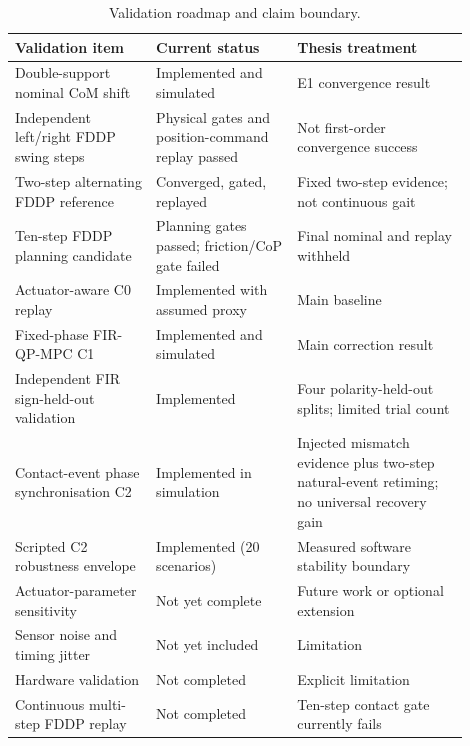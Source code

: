 \documentclass[12pt,a4paper]{report}
\begin{document}
\begin{table}[htbp]
\centering
\caption{Validation roadmap and claim boundary.}
\label{tab:validation_roadmap}
\begin{tabular}{@{}p{0.28\linewidth}p{0.28\linewidth}p{0.34\linewidth}@{}}
\toprule
Validation item & Current status & Thesis treatment \\
\midrule
Double-support nominal CoM shift & Implemented and simulated & E1 convergence result \\
Independent left/right FDDP swing steps & Physical gates and position-command replay passed & Not first-order convergence success \\
Two-step alternating FDDP reference & Converged, gated, replayed & Fixed two-step evidence; not continuous gait \\
Ten-step FDDP planning candidate & Planning gates passed; friction/CoP gate failed & Final nominal and replay withheld \\
Actuator-aware C0 replay & Implemented with assumed proxy & Main baseline \\
Fixed-phase FIR-QP-MPC C1 & Implemented and simulated & Main correction result \\
Independent FIR sign-held-out validation & Implemented & Four polarity-held-out splits; limited trial count \\
Contact-event phase synchronisation C2 & Implemented in simulation & Injected mismatch evidence plus two-step natural-event retiming; no universal recovery gain \\
Scripted C2 robustness envelope & Implemented (20 scenarios) & Measured software stability boundary \\
Actuator-parameter sensitivity & Not yet complete & Future work or optional extension \\
Sensor noise and timing jitter & Not yet included & Limitation \\
Hardware validation & Not completed & Explicit limitation \\
Continuous multi-step FDDP replay & Not completed & Ten-step contact gate currently fails \\
\bottomrule
\end{tabular}
\end{table}
 
\end{document}
